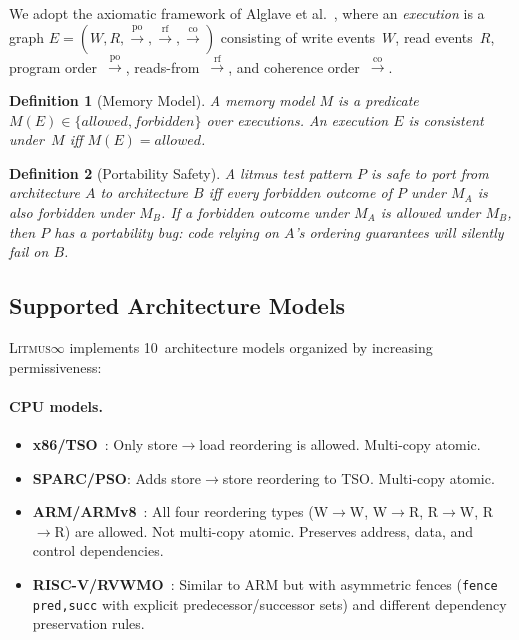 \documentclass[10pt]{article}
\newcommand{\litmus}{\textsc{Litmus$\infty$}}
\newcommand{\rf}{\ensuremath{\xrightarrow{\text{rf}}}}
\newcommand{\co}{\ensuremath{\xrightarrow{\text{co}}}}
\newcommand{\po}{\ensuremath{\xrightarrow{\text{po}}}}
\newtheorem{definition}{Definition}
\begin{document}
We adopt the axiomatic framework of Alglave et
al.~\cite{Alglave2014}, where an \emph{execution} is a graph
$E = (W, R, \po, \rf, \co)$ consisting of write events~$W$, read
events~$R$, program order~$\po$, reads-from~$\rf$, and coherence
order~$\co$.

\begin{definition}[Memory Model]
A memory model $M$ is a predicate $M(E) \in \{\textit{allowed},
\textit{forbidden}\}$ over executions. An execution $E$ is
\emph{consistent} under~$M$ iff $M(E) = \textit{allowed}$.
\end{definition}

\begin{definition}[Portability Safety]
A litmus test pattern $P$ is \emph{safe} to port from architecture $A$
to architecture $B$ iff every forbidden outcome of $P$ under $M_A$ is
also forbidden under $M_B$. If a forbidden outcome under $M_A$ is
allowed under $M_B$, then $P$ has a \emph{portability bug}: code
relying on $A$'s ordering guarantees will silently fail on $B$.
\end{definition}

\subsection{Supported Architecture Models}

\litmus{} implements 10~architecture models organized by increasing
permissiveness:

\paragraph{CPU models.}
\begin{itemize}[nosep]
\item \textbf{x86/TSO}~\cite{OwensSarkarSewell2009}: Only store$\to$load
      reordering is allowed. Multi-copy atomic.
\item \textbf{SPARC/PSO}: Adds store$\to$store reordering to TSO.
      Multi-copy atomic.
\item \textbf{ARM/ARMv8}~\cite{Pulte2018}: All four reordering types
      (W$\to$W, W$\to$R, R$\to$W, R$\to$R) are allowed. Not multi-copy
      atomic. Preserves address, data, and control dependencies.
\item \textbf{RISC-V/RVWMO}~\cite{RISCV2019}: Similar to ARM but with
      asymmetric fences (\texttt{fence pred,succ} with explicit
      predecessor/successor sets) and different dependency preservation
      rules.
\end{itemize}
\end{document}
